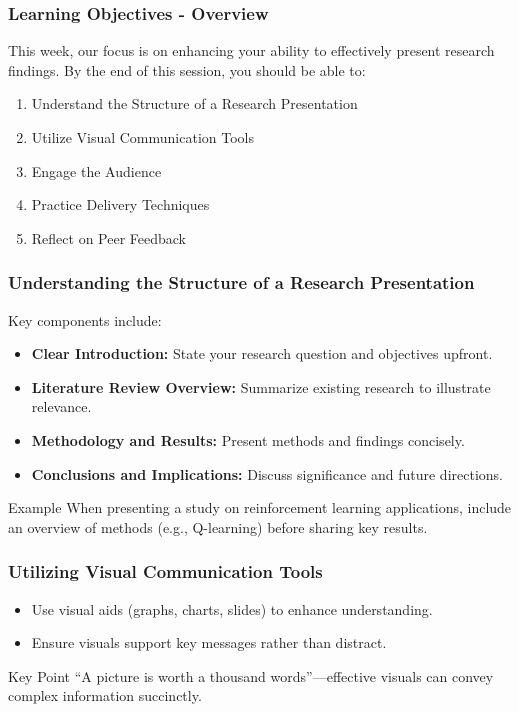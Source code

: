 \documentclass[aspectratio=169]{beamer}
\begin{document}
\begin{frame}[fragile]
    \frametitle{Learning Objectives - Overview}
    This week, our focus is on enhancing your ability to effectively present research findings. 
    By the end of this session, you should be able to:
    \begin{enumerate}
        \item Understand the Structure of a Research Presentation
        \item Utilize Visual Communication Tools
        \item Engage the Audience
        \item Practice Delivery Techniques
        \item Reflect on Peer Feedback
    \end{enumerate}
\end{frame}

\begin{frame}[fragile]
    \frametitle{Understanding the Structure of a Research Presentation}
    Key components include:
    \begin{itemize}
        \item \textbf{Clear Introduction:} State your research question and objectives upfront.
        \item \textbf{Literature Review Overview:} Summarize existing research to illustrate relevance.
        \item \textbf{Methodology and Results:} Present methods and findings concisely.
        \item \textbf{Conclusions and Implications:} Discuss significance and future directions.
    \end{itemize}
    \begin{block}{Example}
        When presenting a study on reinforcement learning applications, 
        include an overview of methods (e.g., Q-learning) before sharing key results.
    \end{block}
\end{frame}

\begin{frame}[fragile]
    \frametitle{Utilizing Visual Communication Tools}
    \begin{itemize}
        \item Use visual aids (graphs, charts, slides) to enhance understanding.
        \item Ensure visuals support key messages rather than distract.
    \end{itemize}
    \begin{block}{Key Point}
        ``A picture is worth a thousand words''—effective visuals can convey complex information succinctly.
    \end{block}
\end{frame}
\end{document}
